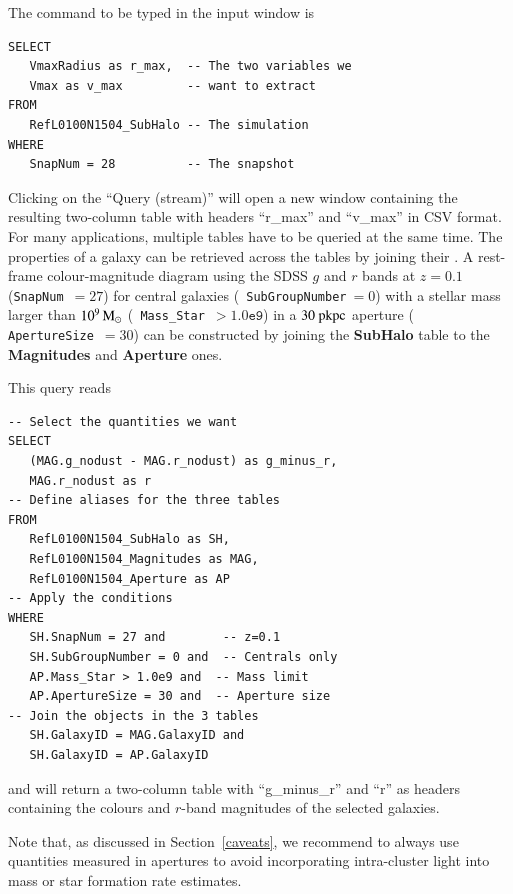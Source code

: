 \noindent 
The \sql command to be typed in the input window is
{
\sqlstyle
{
\footnotesize
\begin{lstlisting}[numbers = none,caption={Generate
      $r_{\max}$-$v_{\max}$ table at $z=0$}]
SELECT        
   VmaxRadius as r_max,  -- The two variables we
   Vmax as v_max         -- want to extract
FROM 
   RefL0100N1504_SubHalo -- The simulation
WHERE  
   SnapNum = 28          -- The snapshot 
\end{lstlisting}
}
}
\noindent Clicking on the ``Query (stream)'' will open a new window containing
the resulting two-column table with headers ``r\_max'' and ``v\_max''
in CSV format. \\


For many applications, multiple \sql tables have to be queried at the same
time. The properties of a galaxy can be retrieved across the tables by joining
their \GalaxyID. A rest-frame colour-magnitude diagram using the SDSS $g$ and
$r$ bands at $z=0.1$ ({\tt SnapNum}~$=27$) for central galaxies ({\tt
  SubGroupNumber}$~=0$) with a stellar mass larger than $10^9\, \mathrm{M}_\odot$ ({\tt
  Mass\_Star}~$>{\mathtt{1.0e9}}$) in a $30~\rm{pkpc}$ aperture ({\tt
  ApertureSize}~$=30$) can be constructed by joining the {\bf SubHalo} table to
the {\bf Magnitudes} and {\bf Aperture} ones.

This query reads
{
\sqlstyle
{
\footnotesize
\begin{lstlisting}[numbers = none,caption={Generate
      table of $g-r$ vs. $r$ colour-magnitude table for central
      galaxies with $M_*>10^9$ at $z=0.1$}]
-- Select the quantities we want
SELECT        
   (MAG.g_nodust - MAG.r_nodust) as g_minus_r,
   MAG.r_nodust as r
-- Define aliases for the three tables
FROM 
   RefL0100N1504_SubHalo as SH,
   RefL0100N1504_Magnitudes as MAG,
   RefL0100N1504_Aperture as AP
-- Apply the conditions
WHERE  
   SH.SnapNum = 27 and        -- z=0.1
   SH.SubGroupNumber = 0 and  -- Centrals only
   AP.Mass_Star > 1.0e9 and  -- Mass limit
   AP.ApertureSize = 30 and  -- Aperture size
-- Join the objects in the 3 tables
   SH.GalaxyID = MAG.GalaxyID and
   SH.GalaxyID = AP.GalaxyID
\end{lstlisting}
}
}
\noindent and will return a two-column table with ``g\_minus\_r'' and ``r'' as
headers containing the colours and $r$-band magnitudes of the selected
galaxies.

Note that, as discussed in Section~\ref{caveats}, we recommend to always use
quantities measured in apertures to avoid incorporating intra-cluster light into
mass or star formation rate estimates. \\

